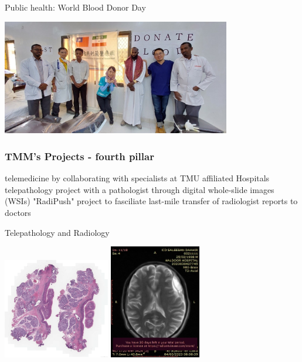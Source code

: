 \documentclass[aspectratio=169]{beamer}
\begin{document}
\begin{frame}{Public health: World Blood Donor Day}
    \begin{center}
        
        \includegraphics[width=0.75\textwidth]{IMG-4441.JPG}
    \end{center}
\end{frame}




\begin{frame}
\frametitle{TMM's Projects - fourth pillar}
\begin{outline}    
    \1 telemedicine
        \2 by collaborating with specialists at TMU affiliated Hospitals
        \2 telepathology project with a pathologist through digital whole-slide images (WSIs)
        \2 "RadiPush" project to fasciliate last-mile transfer of radiologist reports to doctors
    
\end{outline}
\end{frame}


\begin{frame}{Telepathology and Radiology}
    \begin{center}
        \includegraphics[width=0.35\textwidth]{TH1919729C1_HE.jpeg}
        \includegraphics[width=0.30\textwidth]{IMG-0007-00001.jpg}
    \end{center}
\end{frame}
\end{document}
